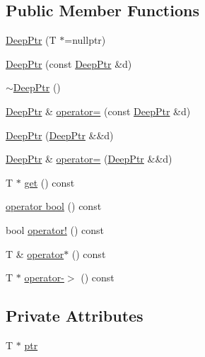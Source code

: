 \subsection*{Public Member Functions}
\begin{DoxyCompactItemize}
\item 
\hyperlink{classDeepPtr_a85b1300bf23784588d48939280fad384_a85b1300bf23784588d48939280fad384}{Deep\+Ptr} (T $\ast$=nullptr)
\item 
\hyperlink{classDeepPtr_adfa6604344126aad1293c5d8d1132dad_adfa6604344126aad1293c5d8d1132dad}{Deep\+Ptr} (const \hyperlink{classDeepPtr}{Deep\+Ptr} \&d)
\item 
\hyperlink{classDeepPtr_ae9e23e5eb0c9d6f4a3621d2a2d9ed1c9_ae9e23e5eb0c9d6f4a3621d2a2d9ed1c9}{$\sim$\+Deep\+Ptr} ()
\item 
\hyperlink{classDeepPtr}{Deep\+Ptr} \& \hyperlink{classDeepPtr_a52350f0618e9385f3a3d3fd97ec5ea0b_a52350f0618e9385f3a3d3fd97ec5ea0b}{operator=} (const \hyperlink{classDeepPtr}{Deep\+Ptr} \&d)
\item 
\hyperlink{classDeepPtr_ae620731998d59ab7e60be48b081845c8_ae620731998d59ab7e60be48b081845c8}{Deep\+Ptr} (\hyperlink{classDeepPtr}{Deep\+Ptr} \&\&d)
\item 
\hyperlink{classDeepPtr}{Deep\+Ptr} \& \hyperlink{classDeepPtr_a00ff7a47f4cab7fa20de5fd5b6546756_a00ff7a47f4cab7fa20de5fd5b6546756}{operator=} (\hyperlink{classDeepPtr}{Deep\+Ptr} \&\&d)
\item 
T $\ast$ \hyperlink{classDeepPtr_a516165073b1c5f26e25af5cc479e55e9_a516165073b1c5f26e25af5cc479e55e9}{get} () const
\item 
\hyperlink{classDeepPtr_a2a14ae8e401d478df8217d4ced9d68e5_a2a14ae8e401d478df8217d4ced9d68e5}{operator bool} () const
\item 
bool \hyperlink{classDeepPtr_ab56cff47e67dd4b60b7680ec47f63cfc_ab56cff47e67dd4b60b7680ec47f63cfc}{operator!} () const
\item 
T \& \hyperlink{classDeepPtr_a3e338b1c727ea5e291ebe65588c37ec3_a3e338b1c727ea5e291ebe65588c37ec3}{operator$\ast$} () const
\item 
T $\ast$ \hyperlink{classDeepPtr_ac9c2935e0a0ec88bf52a6695ace6d7bb_ac9c2935e0a0ec88bf52a6695ace6d7bb}{operator-\/$>$} () const
\end{DoxyCompactItemize}
\subsection*{Private Attributes}
\begin{DoxyCompactItemize}
\item 
T $\ast$ \hyperlink{classDeepPtr_aa738303c3bb2c634b6edfee93bdf2a07_aa738303c3bb2c634b6edfee93bdf2a07}{ptr}
\end{DoxyCompactItemize}


